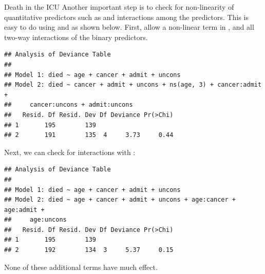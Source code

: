 \documentclass[11pt]{book}
\renewenvironment{knitrout}{\small\renewcommand{\baselinestretch}{.85}}{} %
\begin{document}
\begin{Example}[icu1]{Death in the ICU}
Another important step is to check for non-linearity of quantitative predictors such
as  and interactions among the predictors.  This is easy to do using
 and  as shown below.  First, allow a non-linear term
in , and all two-way interactions of the binary predictors.
\begin{knitrout}
\color{fgcolor}\begin{kframe}
\begin{alltt}
 \hlkwb{<-}  \hlopt{~}  \hlopt{-} \hlopt{+} \hlstd{)} \hlopt{+} \hlopt{+}\hlopt{+}\hlopt{^}\hlstd{)}
 \hlstd{=}\hlstd{)}
\end{alltt}
\begin{verbatim}
## Analysis of Deviance Table
## 
## Model 1: died ~ age + cancer + admit + uncons
## Model 2: died ~ cancer + admit + uncons + ns(age, 3) + cancer:admit + 
##     cancer:uncons + admit:uncons
##   Resid. Df Resid. Dev Df Deviance Pr(>Chi)
## 1       195        139                     
## 2       191        135  4     3.73     0.44
\end{verbatim}
\end{kframe}
\end{knitrout}
Next, we can check for interactions with :
\begin{knitrout}
\color{fgcolor}\begin{kframe}
\begin{alltt}
 \hlkwb{<-}  \hlopt{~}  \hlopt{+} \hlopt{*}\hlopt{+}\hlopt{+}
 \hlstd{=}\hlstd{)}
\end{alltt}
\begin{verbatim}
## Analysis of Deviance Table
## 
## Model 1: died ~ age + cancer + admit + uncons
## Model 2: died ~ age + cancer + admit + uncons + age:cancer + age:admit + 
##     age:uncons
##   Resid. Df Resid. Dev Df Deviance Pr(>Chi)
## 1       195        139                     
## 2       192        134  3     5.37     0.15
\end{verbatim}
\end{kframe}
\end{knitrout}
\noindent None of these additional terms have much effect.


\end{Example}
\end{document}
